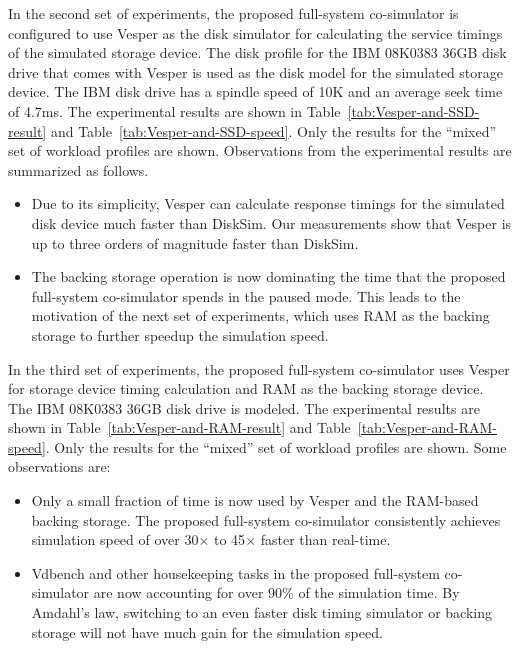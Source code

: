 In the second set of experiments, the proposed full-system co-simulator is configured to use Vesper as the disk simulator for calculating the service timings of the simulated storage device. The disk profile for the IBM 08K0383 36GB disk drive that comes with Vesper is used as the disk model for the simulated storage device. The IBM disk drive has a spindle speed of 10K and an average seek time of 4.7ms. The experimental results are shown in Table~\ref{tab:Vesper-and-SSD-result} and Table~\ref{tab:Vesper-and-SSD-speed}. Only the results for the ``mixed'' set of workload profiles are shown. Observations from the experimental results are summarized as follows.

\begin{itemize}
	\item Due to its simplicity, Vesper can calculate response timings for the simulated disk device much faster than DiskSim. Our measurements show that Vesper is up to three orders of magnitude faster than DiskSim.
	
	\item The backing storage operation is now dominating the time that the proposed full-system co-simulator spends in the paused mode. This leads to the motivation of the next set of experiments, which uses RAM as the backing storage to further speedup the simulation speed.
\end{itemize}

In the third set of experiments, the proposed full-system co-simulator uses Vesper for storage device timing calculation and RAM as the backing storage device. The IBM 08K0383 36GB disk drive is modeled. The experimental results are shown in Table~\ref{tab:Vesper-and-RAM-result} and Table~\ref{tab:Vesper-and-RAM-speed}. Only the results for the ``mixed'' set of workload profiles are shown. Some observations are:

\begin{itemize}
	\item Only a small fraction of time is now used by Vesper and the RAM-based backing storage. The proposed full-system co-simulator consistently achieves simulation speed of over 30$\times$ to 45$\times$ faster than real-time.
	
	\item Vdbench and other housekeeping tasks in the proposed full-system co-simulator are now accounting for over 90\% of the simulation time. By Amdahl's law, switching to an even faster disk timing simulator or backing storage will not have much gain for the simulation speed.
\end{itemize}


